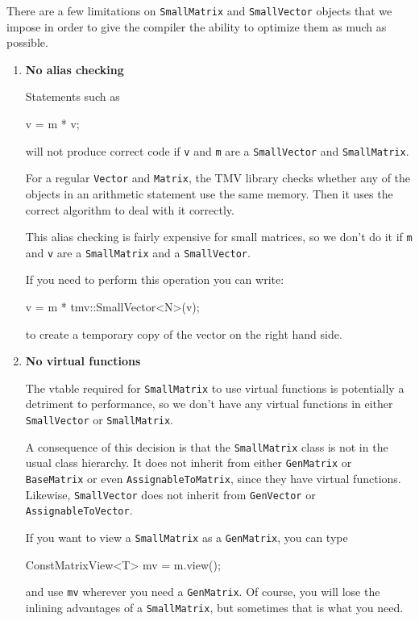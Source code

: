 \documentclass[twoside,letterpaper,11pt]{article}
\renewcommand{\tt}[1]{{\lstinline {#1}}}
\begin{document}
There are a few limitations on \tt{SmallMatrix} and \tt{SmallVector} objects
that we impose in order to give the compiler the ability to
optimize them as much as possible.

\begin{enumerate}

\item
\textbf{No alias checking}

Statements such as 
\begin{tmvcode}
v = m * v;
\end{tmvcode}
will not produce correct code if \tt{v} and \tt{m} are a \tt{SmallVector} and \tt{SmallMatrix}.  

For a regular \tt{Vector} and \tt{Matrix}, the TMV library checks whether any of 
the objects in an arithmetic statement use the same memory.  
Then it uses the correct algorithm to deal with it 
correctly.  

This alias checking is fairly expensive for small matrices, so we don't do it if
\tt{m} and \tt{v} are a \tt{SmallMatrix} and a \tt{SmallVector}.  

If you need to perform this operation you can write:
\begin{tmvcode}
v = m * tmv::SmallVector<N>(v);
\end{tmvcode}
to create a temporary copy of the vector on the right hand side. 

\item
\textbf{No virtual functions}

The vtable required for \tt{SmallMatrix} to use virtual functions is potentially a 
detriment to performance, so we don't have any virtual functions in either \tt{SmallVector}
or \tt{SmallMatrix}. 

A consequence of this decision is that the \tt{SmallMatrix} class is not in the usual
class hierarchy.  It
does not inherit from either \tt{GenMatrix} or \tt{BaseMatrix} or even \tt{AssignableToMatrix}, 
since they have virtual functions.  
Likewise, \tt{SmallVector} does not inherit from \tt{GenVector} or \tt{AssignableToVector}.

If you want to view a \tt{SmallMatrix} as a \tt{GenMatrix}, you can type
\begin{tmvcode}
ConstMatrixView<T> mv = m.view();
\end{tmvcode}
and use \tt{mv} wherever you need a \tt{GenMatrix}.  Of course, you will lose the 
inlining advantages of a \tt{SmallMatrix}, but sometimes that is what you need.


\end{enumerate}
\end{document}
